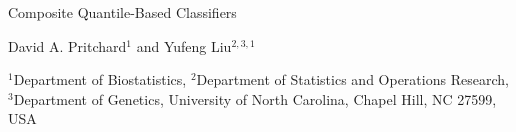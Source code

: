 \documentclass{article}
\begin{document}
\begin{center}

  {\LARGE Composite Quantile-Based Classifiers} \vspace{5mm}

  {\large David A. Pritchard$^1$ and Yufeng Liu$^{2,3,1}$} \vspace{5mm}

  {\large
    $^1$Department of Biostatistics,
    $^2$Department of Statistics and Operations Research,
    $^3$Department of Genetics,
    University of North Carolina, Chapel Hill, NC 27599, USA
  }

\end{center}

\begin{abstract}
  
\end{abstract}


















\end{document}

